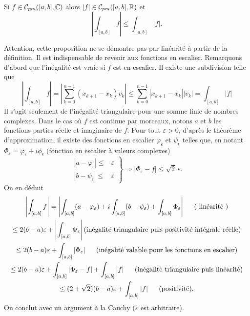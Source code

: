 \begin{propn}
 Si $f\in \mathcal C_{pm}([a,b],\mathbb{C})$ alors $|f|\in \mathcal C_{pm}([a,b],\mathbb{R})$ et
\begin{displaymath}
 \left \vert \int_{[a,b]}f \right \vert \leq \int_{[a,b]}|f|. 
\end{displaymath}
\end{propn}
\begin{demo}
 Attention, cette proposition ne se démontre pas par linéarité à partir de la définition. Il est indispensable de revenir aux fonctions en escalier.\newline
Remarquons d'abord que l'inégalité est vraie si $f$ est en escalier. Il existe une subdivision telle que 
\begin{displaymath}
 \left\vert \int_{[a,b]}f\right\vert = \left\vert\sum_{k=0}^{n-1}(x_{k+1}-x_k)v_k\right\vert \leq
\sum_{k=0}^{n-1}|x_{k+1}-x_k||v_k| = \int_{[a,b]}|f|
\end{displaymath}
Il s'agit seulement de l'inégalité triangulaire pour une somme finie de nombres complexes.\newline
Dans le cas où $f$ est continue par morceaux, notons $a$ et $b$ les fonctions parties réelle et imaginaire de $f$.\newline
Pour tout $\varepsilon>0$, d'après le théorème d'approximation, il existe des fonctions en escalier $\varphi_\epsilon$ et $\psi_\epsilon$ telles que, en notant  $\Phi_\varepsilon=\varphi_\epsilon+i\phi_\epsilon$ (fonction en escalier à valeurs complexes) 
\begin{displaymath}
\left. 
\begin{aligned}
|a-\varphi_\epsilon| \leq& \varepsilon \\ |b-\psi_\epsilon| \leq& \varepsilon  
\end{aligned}
\right\rbrace 
\Rightarrow \left|\Phi_\varepsilon - f\right| \leq \sqrt{2}\, \varepsilon .
\end{displaymath}
On en déduit
\begin{multline*}
\left| \int_{[a,b]}f \right| = \left| \int_{[a,b]}(a-\varphi_\varepsilon) + i \int_{[a,b]}(b-\psi_\varepsilon) + \int_{[a,b]}\Phi_\varepsilon\right| \hspace{0.5cm}(\text{ linéarité })\\
\leq 2(b-a)\varepsilon +  \left|\int_{[a,b]}\Phi_\varepsilon\right| \text{(inégalité triangulaire puis positivité intégrale réelle)}\\
\leq 2(b-a)\varepsilon + \int_{[a,b]}\left|\Phi_\varepsilon\right| \hspace{0.5cm} \text{(inégalité valable pour les fonctions en escalier)} \\
\leq 2(b-a)\varepsilon + \int_{[a,b]}\left|\Phi_\varepsilon - f\right|+ \int_{[a,b]}\left|f\right| \hspace{0.5cm} \text{(inégalité triangulaire puis linéarité)} \\
\leq (2+\sqrt{2})(b-a)\varepsilon + \int_{[a,b]}\left|f\right| \hspace{0.5cm} \text{(positivité)}.
\end{multline*}
On conclut avec un argument à la Cauchy ($\varepsilon$ est arbitraire).
\end{demo}

